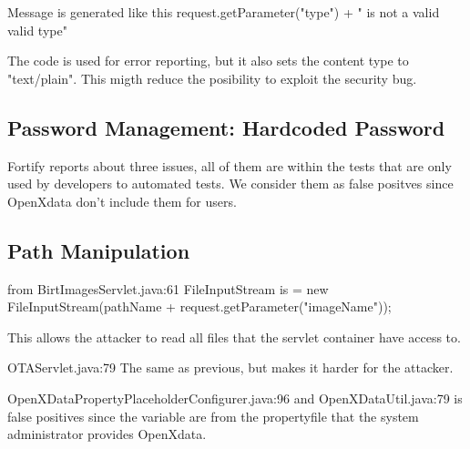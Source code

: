 \documentclass[11pt,a4paper]{article}
\theoremstyle{definition}
\begin{document}
Message is generated like this
request.getParameter("type") + " is not a valid valid type"

The code is used for error reporting, but it also sets the content type to "text/plain".
This migth reduce the posibility to exploit the security bug.

\subsection{Password Management: Hardcoded Password}
Fortify reports about three issues, all of them are within the tests that are only used
by developers to automated tests. We consider them as false positves since OpenXdata don't
include them for users.

\subsection{Path Manipulation}
from BirtImagesServlet.java:61
FileInputStream is = new FileInputStream(pathName + request.getParameter("imageName"));

This allows the attacker to read all files that the servlet container have access to.

OTAServlet.java:79
The same as previous, but makes it harder for the attacker.

OpenXDataPropertyPlaceholderConfigurer.java:96 and OpenXDataUtil.java:79 
is false positives since the variable are from the propertyfile that the system administrator provides OpenXdata.
\end{document}
